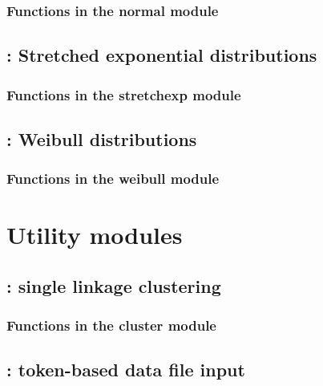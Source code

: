 \documentclass[10pt]{book}
\begin{document}
\subsection{Functions in the normal module}


\newpage
\section{: Stretched exponential distributions}

\subsection{Functions in the stretchexp module}


\newpage
\section{: Weibull distributions}

\subsection{Functions in the weibull module}


\newpage
\chapter{Utility modules}

\newpage
\section{: single linkage clustering}

\subsection{Functions in the cluster module}


\newpage
\section{: token-based data file input}

\end{document}
